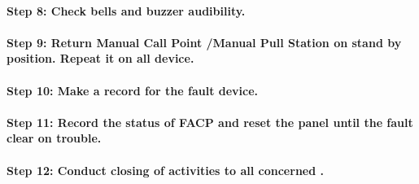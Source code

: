 \paragraph{Step 8: Check bells and buzzer audibility.}

\paragraph{Step 9: Return Manual Call Point /Manual Pull Station on stand by position. Repeat it on all device.}

\paragraph{Step 10: Make a record for the fault device.}

\paragraph{Step 11: Record the status of FACP and reset the panel until the fault clear on trouble.}

\paragraph{Step 12: Conduct closing of activities to all concerned .}
